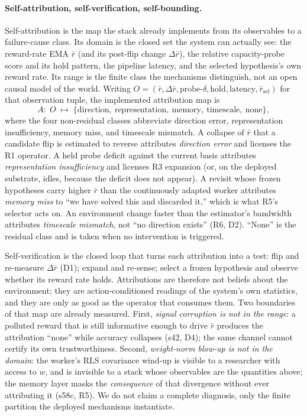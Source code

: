\documentclass[preprint,12pt]{elsarticle}
\begin{document}
\paragraph{Self-attribution, self-verification, self-bounding.}
Self-attribution is the map the stack already implements from its observables
to a failure-cause class. Its domain is the closed set the system can
actually see: the reward-rate EMA $\bar r$ (and its post-flip change
$\Delta\bar r$), the relative capacity-probe score and its hold pattern, the
pipeline latency, and the selected hypothesis's own reward rate. Its range
is the finite class the mechanisms distinguish, not an open causal model of
the world. Writing $O=(\bar r,\Delta\bar r,\text{probe-}\delta,\text{hold},
\text{latency},\bar r_{\mathrm{sel}})$ for that observation tuple, the
implemented attribution map is
\[
A:\;O\;\longmapsto\;\{\text{direction},\ \text{representation},\
\text{memory},\ \text{timescale},\ \text{none}\},
\]
where the four non-residual classes abbreviate direction error,
representation insufficiency, memory miss, and timescale mismatch.
A collapse of $\bar r$ that a candidate flip is estimated to reverse
attributes \emph{direction error} and licenses the R1 operator. A held probe
deficit against the current basis attributes \emph{representation
insufficiency} and licenses R3 expansion (or, on the deployed substrate,
idles, because the deficit does not appear). A revisit whose frozen
hypotheses carry higher $\bar r$ than the continuously adapted worker
attributes \emph{memory miss} to ``we have solved this and discarded it,''
which is what R5's selector acts on. An environment change faster than the
estimator's bandwidth attributes \emph{timescale mismatch}, not ``no
direction exists'' (R6, D2). ``None'' is the residual class and is taken when
no intervention is triggered.

Self-verification is the closed loop that turns each attribution into a
test: flip and re-measure $\Delta\bar r$ (D1); expand and re-sense; select a
frozen hypothesis and observe whether its reward rate holds. Attributions
are therefore not beliefs about the environment; they are action-conditioned
readings of the system's own statistics, and they are only as good as the
operator that consumes them. Two boundaries of that map are already
measured. First, \emph{signal corruption is not in the range}: a polluted
reward that is still informative enough to drive $\bar r$ produces the
attribution ``none'' while accuracy collapses (s42, D4); the same channel
cannot certify its own trustworthiness. Second, \emph{weight-norm blow-up is
not in the domain}: the worker's RLS covariance wind-up is visible to a
researcher with access to $w$, and is invisible to a stack whose observables
are the quantities above; the memory layer masks the \emph{consequence} of
that divergence without ever attributing it (s58c, R5). We do not claim a
complete diagnosis, only the finite partition the deployed mechanisms
instantiate.
\end{document}
